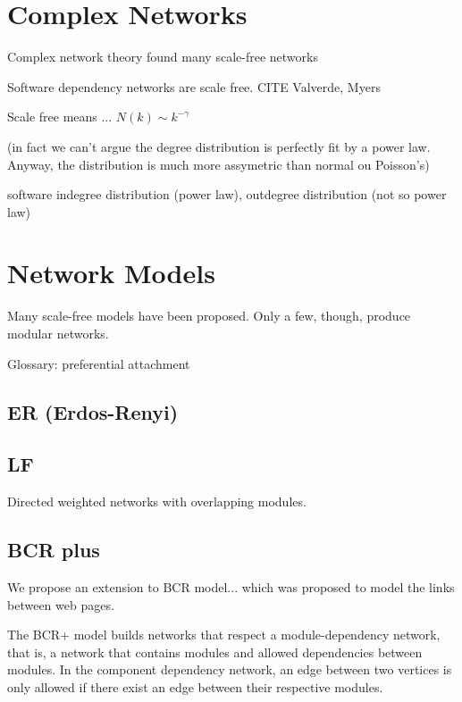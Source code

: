 \section{Complex Networks}

Complex network theory found many scale-free networks

Software dependency networks are scale free. CITE Valverde, Myers

Scale free means ... $N(k) \sim k^{-\gamma}$

(in fact we can't argue the degree distribution is perfectly fit by a power law.
Anyway, the distribution is much more assymetric than normal ou Poisson's)

software indegree distribution (power law), outdegree distribution (not so power
law)

\section{Network Models}

Many scale-free models have been proposed. Only a few, though, produce modular
networks. 

Glossary: preferential attachment

\subsection{ER (Erdos-Renyi)}


\subsection{LF}

Directed weighted networks with overlapping modules.

\subsection{BCR plus}

We propose an extension to BCR model... which was proposed to model the links
between web pages.

The BCR+ model builds networks that respect a module-dependency network, that
is, a network that contains modules and allowed dependencies between modules. 
In the component dependency network, an edge between two vertices is only
allowed if there exist an edge between their respective modules.

